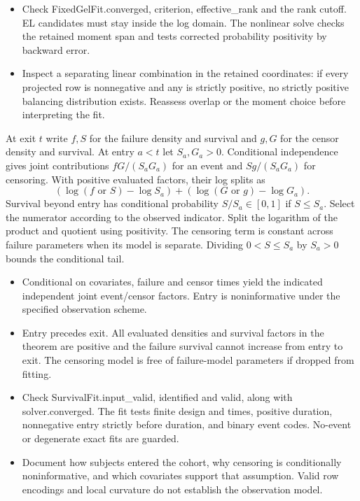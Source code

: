 \expandafter\def\csname statadic@diagnostics@STATADIC-GEL-001\endcsname{\begin{itemize}
\item Check FixedGelFit.converged, criterion, effective\_rank and the rank cutoff. EL candidates must stay inside the log domain. The nonlinear solve checks the retained moment span and tests corrected probability positivity by backward error.
\item Inspect a separating linear combination in the retained coordinates: if every projected row is nonnegative and any is strictly positive, no strictly positive balancing distribution exists. Reassess overlap or the moment choice before interpreting the fit.
\end{itemize}}
\expandafter\def\csname statadic@statement@STATADIC-SURVIVAL-001\endcsname{At exit $t$ write $f,S$ for the failure density and
  survival and $g,G$ for the censor density and survival. At entry $a<t$
  let $S_a,G_a>0$. Conditional independence gives joint contributions
  $fG/(S_aG_a)$ for an event and $Sg/(S_aG_a)$ for censoring.
  With positive evaluated factors, their log splits as
  \[
  (\log(f\text{ or }S)-\log S_a)
  +(\log(G\text{ or }g)-\log G_a).
  \]
  Survival beyond entry has conditional probability $S/S_a\in[0,1]$
  if $S\le S_a$.}
\expandafter\def\csname statadic@proof@STATADIC-SURVIVAL-001\endcsname{Select the numerator according to the observed indicator.
  Split the logarithm of the product and quotient using positivity. The
  censoring term is constant across failure parameters when its model is
  separate. Dividing $0<S\le S_a$ by $S_a>0$ bounds the conditional tail.}
\expandafter\def\csname statadic@assumptions@STATADIC-SURVIVAL-001\endcsname{\begin{itemize}
\item Conditional on covariates, failure and censor times yield the indicated independent joint event/censor factors. Entry is noninformative under the specified observation scheme.
\item Entry precedes exit. All evaluated densities and survival factors in the theorem are positive and the failure survival cannot increase from entry to exit. The censoring model is free of failure-model parameters if dropped from fitting.
\end{itemize}}
\expandafter\def\csname statadic@diagnostics@STATADIC-SURVIVAL-001\endcsname{\begin{itemize}
\item Check SurvivalFit.input\_valid, identified and valid, along with solver.converged. The fit tests finite design and times, positive duration, nonnegative entry strictly before duration, and binary event codes. No-event or degenerate exact fits are guarded.
\item Document how subjects entered the cohort, why censoring is conditionally noninformative, and which covariates support that assumption. Valid row encodings and local curvature do not establish the observation model.
\end{itemize}}
